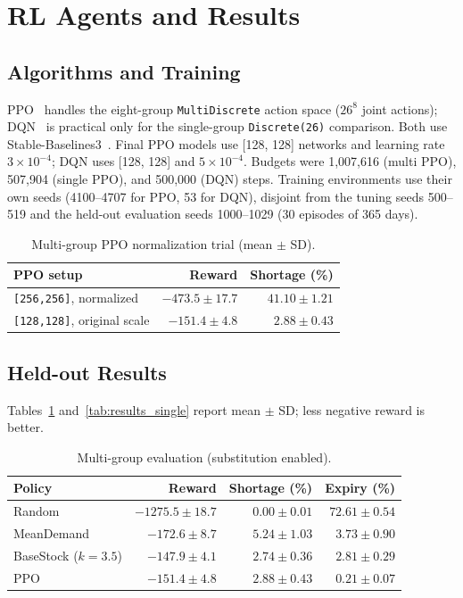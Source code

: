 \section{RL Agents and Results}

\subsection{Algorithms and Training}

PPO~\cite{schulman2017ppo} handles the eight-group \texttt{MultiDiscrete} action space ($26^8$ joint actions); DQN~\cite{mnih2015dqn} is practical only for the single-group \texttt{Discrete(26)} comparison. Both use Stable-Baselines3~\cite{raffin2021sb3}. Final PPO models use [128, 128] networks and learning rate $3\times10^{-4}$; DQN uses [128, 128] and $5\times10^{-4}$. Budgets were 1,007,616 (multi PPO), 507,904 (single PPO), and 500,000 (DQN) steps. Training environments use their own seeds (4100--4707 for PPO, 53 for DQN), disjoint from the tuning seeds 500--519 and the held-out evaluation seeds 1000--1029 (30 episodes of 365 days).

\begin{table}[!t]
\centering
\caption{Multi-group PPO normalization trial (mean $\pm$ SD).}
\scriptsize
\begin{tabular}{lrr}
\toprule
PPO setup & Reward & Shortage (\%) \\
\midrule
\texttt{[256,256]}, normalized & $-473.5\pm17.7$ & $41.10\pm1.21$ \\
\texttt{[128,128]}, original scale & $-151.4\pm4.8$ & $2.88\pm0.43$ \\
\bottomrule
\end{tabular}
\end{table}

\subsection{Held-out Results}

Tables~\ref{tab:results_multi} and~\ref{tab:results_single} report mean $\pm$ SD; less negative reward is better.

\begin{table}[!t]
\centering
\caption{Multi-group evaluation (substitution enabled).}
\label{tab:results_multi}
\scriptsize
\begin{tabular}{lrrr}
\toprule
Policy & Reward & Shortage (\%) & Expiry (\%) \\
\midrule
Random & $-1275.5\pm18.7$ & $0.00\pm0.01$ & $72.61\pm0.54$ \\
MeanDemand & $-172.6\pm8.7$ & $5.24\pm1.03$ & $3.73\pm0.90$ \\
BaseStock ($k=3.5$) & $-147.9\pm4.1$ & $2.74\pm0.36$ & $2.81\pm0.29$ \\
PPO & $-151.4\pm4.8$ & $2.88\pm0.43$ & $0.21\pm0.07$ \\
\bottomrule
\end{tabular}
\end{table}

